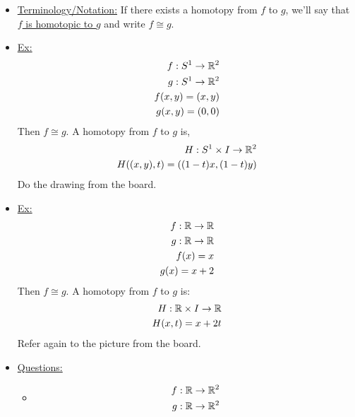     \begin{itemize}
        \item \underline{Terminology/Notation:} If there exists a homotopy from
            $f$ to $g$, we'll say that \underline{$f$ is homotopic to $g$} and write
            $f\cong g$.\\
        \item \underline{Ex:}
            \begin{align*}
                f: S^{1}\rightarrow \mathbb{R}^2\\
                g: S^{1}\rightarrow \mathbb{R}^2\\
                f(x,y)=(x,y)\\
                g(x,y)=(0,0)\\
            \end{align*}
            Then $f\cong g$. A homotopy from $f$ to $g$ is,
            \begin{align*}
                H: S^{1}\times I \rightarrow \mathbb{R}^2\\
                H((x,y),t)=((1-t)x,(1-t)y)\\
            \end{align*}
            Do the drawing from the board.
        \item \underline{Ex:}
            \begin{align*}
                f:\mathbb{R} \rightarrow \mathbb{R}\\
                g:\mathbb{R} \rightarrow \mathbb{R}\\
                f(x)=x\\
                g(x)=x+2\\
            \end{align*}
            Then $f\cong g$. A homotopy from $f$ to $g$ is:
            \begin{align*}
                H:\mathbb{R} \times I \rightarrow \mathbb{R}\\
                H(x,t)=x+2t\\
            \end{align*}
            Refer again to the picture from the board.
        \item \underline{Questions:}
            \begin{itemize}
                \item
                    \begin{align*}
                        f: \R \rightarrow \R^2\\
                        g: \R \rightarrow \R^2\\

\end{align*}
\end{itemize}
\end{itemize}

